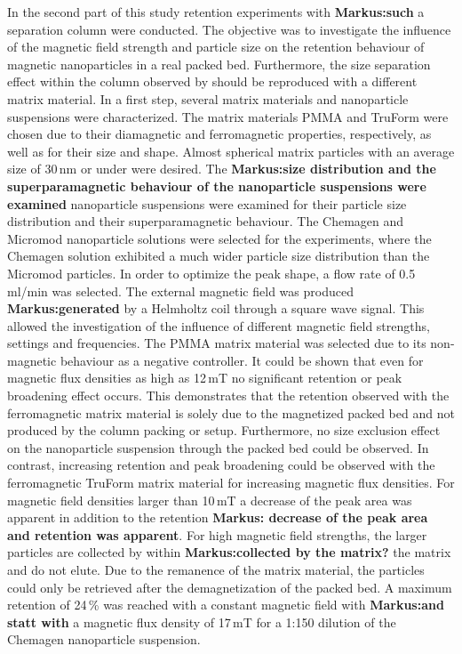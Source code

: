 In the second part of this study retention experiments with \textbf{Markus:such} a separation column were conducted. The objective was to investigate the influence of the magnetic field strength and particle size on the retention behaviour of magnetic nanoparticles in a real packed bed. Furthermore, the size separation effect within the column observed by \cite{AndreMaster} should be reproduced with a different matrix material. 
In a first step, several matrix materials and nanoparticle suspensions were characterized. The matrix materials PMMA and TruForm were chosen due to their diamagnetic and ferromagnetic properties, respectively, as well as for their size and shape. Almost spherical matrix particles with an average size of 30\,nm or under were desired. The \textbf{Markus:size distribution and the superparamagnetic behaviour of the nanoparticle suspensions were examined} nanoparticle suspensions were examined for their particle size distribution and their superparamagnetic behaviour. The Chemagen and Micromod nanoparticle solutions were selected for the experiments, where the Chemagen solution exhibited a much wider particle size distribution than the Micromod particles. In order to optimize the peak shape, a flow rate of 0.5\,ml/min was selected. The external magnetic field was produced \textbf{Markus:generated} by a Helmholtz coil through a square wave signal. This allowed the investigation of the influence of different magnetic field strengths, settings and frequencies. The PMMA matrix material was selected due to its non-magnetic behaviour as a negative controller. It could be shown that even for magnetic flux densities as high as 12\,mT no significant retention or peak broadening effect occurs. This demonstrates that the retention observed with the ferromagnetic matrix material is solely due to the magnetized packed bed and not produced by the column packing or setup. Furthermore, no size exclusion effect on the nanoparticle suspension through the packed bed could be observed. In contrast, increasing retention and peak broadening could be observed with the ferromagnetic TruForm matrix material for increasing magnetic flux densities. For magnetic field densities larger than 10\,mT a decrease of the peak area was apparent in addition to the retention \textbf{Markus: decrease of the peak area and retention was apparent}. For high magnetic field strengths, the larger particles are collected by within \textbf{Markus:collected by the matrix?} the matrix and do not elute. Due to the remanence of the matrix material, the particles could only be retrieved after the demagnetization of the packed bed. A maximum retention of 24\,\% was reached with a constant magnetic field with \textbf{Markus:and statt with} a magnetic flux density of 17\,mT for a 1:150 dilution of the Chemagen nanoparticle suspension.

